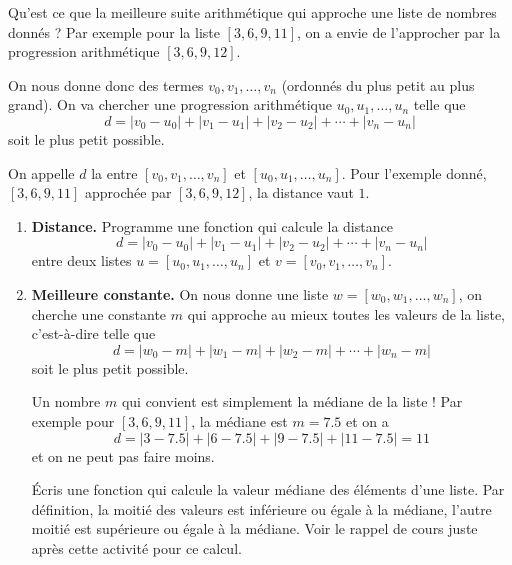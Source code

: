 \documentclass[11pt,class=report,crop=false]{standalone}
\begin{document}


\begin{activite}


Qu'est ce que la meilleure suite arithmétique qui approche une liste de nombres donnés ? Par exemple pour la liste $[3, 6, 9, 11]$, on a envie de l'approcher par la progression arithmétique $[3,6,9,12]$.

On nous donne donc des termes $v_0,v_1,\ldots,v_n$ (ordonnés du plus petit au plus grand). On va chercher une progression arithmétique $u_0,u_1,\ldots,u_n$ telle
que 
$$d = |v_0-u_0| + |v_1-u_1| + |v_2-u_2| + \cdots + |v_n-u_n|$$
soit le plus petit possible.

On appelle $d$ la  entre $[v_0,v_1,\ldots,v_n]$
et $[u_0,u_1,\ldots,u_n]$.
Pour l'exemple donné, $[3, 6, 9, 11]$ approchée par $[3,6,9,12]$, la distance vaut $1$.


\begin{enumerate}
  \item \textbf{Distance.} Programme une fonction  qui calcule la distance
 $$d = |v_0-u_0| + |v_1-u_1| + |v_2-u_2| + \cdots + |v_n-u_n|$$
 entre deux listes $u = [u_0,u_1,\ldots,u_n]$ et $v = [v_0,v_1,\ldots,v_n]$.
  
  \item \textbf{Meilleure constante.} On nous donne une liste $w = [w_0,w_1,\ldots,w_n]$, on cherche une constante $m$ qui approche au mieux toutes les valeurs de la liste, c'est-à-dire telle que 
 $$d = |w_0-m| + |w_1-m| + |w_2-m| + \cdots + |w_n-m|$$ 
soit le plus petit possible.

Un nombre $m$ qui convient est simplement la médiane de la liste !
Par exemple pour $[3, 6, 9, 11]$, la médiane est $m=7.5$ et on a
$$d = |3-7.5| + |6-7.5| + |9-7.5| + |11-7.5| = 11$$
et on ne peut pas faire moins.
  
  Écris une fonction  qui calcule la valeur médiane des éléments d'une liste. Par définition, la moitié des valeurs est inférieure ou égale à la médiane, l'autre moitié est supérieure ou égale à la médiane.
  Voir le rappel de cours juste après cette activité pour ce calcul.
  

\end{enumerate}
\end{activite}
\end{document}
